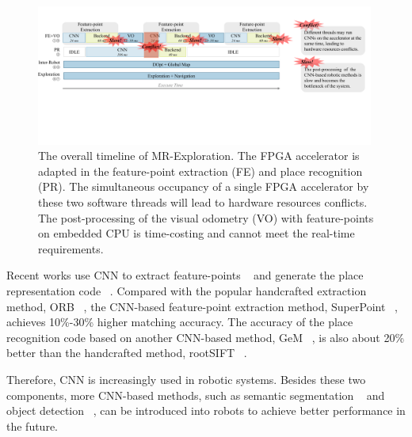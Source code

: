 \begin{figure}[t]
    \centering
    \includegraphics[width=0.99\textwidth]{fig/overalltime.pdf} 	
    \vspace{-2mm}
    \caption{
    The overall timeline of MR-Exploration. The FPGA accelerator is adapted in the feature-point extraction (FE) and place recognition (PR). The simultaneous occupancy of a single FPGA accelerator by these two software threads will lead to hardware resources conflicts. The post-processing of the visual odometry (VO) with feature-points on embedded CPU is time-costing and cannot meet the real-time requirements.
    }
	\label{fig:overalltime}
\end{figure}

Recent works use CNN to extract feature-points  ~\cite{detone2018superpoint, simo2015discriminative, yi2016lift} and generate the place representation code  ~\cite{arandjelovic2016netvlad, radenovic2018fine}. 
Compared with the popular handcrafted extraction method, ORB ~\cite{Mur-Artal:2017281}, the CNN-based feature-point extraction method, SuperPoint  ~\cite{detone2018superpoint}, achieves 10\%-30\% higher matching accuracy.
The accuracy of the place recognition code based on another CNN-based method, GeM  ~\cite{radenovic2018fine}, is also about 20\% better than the handcrafted method, rootSIFT  ~\cite{jegou2014triang}.

Therefore, CNN is increasingly used in robotic systems. 
Besides these two components, more CNN-based methods, such as semantic segmentation  ~\cite{long2015fully} and object detection  ~\cite{ren2015faster}, can be introduced into robots to achieve better performance in the future. 

